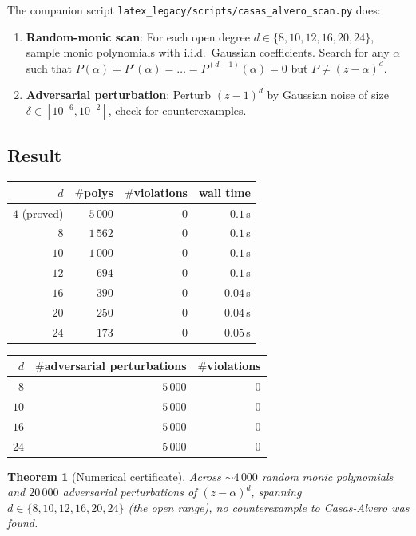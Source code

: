 \documentclass[11pt,a4paper]{article}
\newtheorem{theorem}{Theorem}[section]
\begin{document}
The companion script \verb|latex_legacy/scripts/casas_alvero_scan.py| does:
\begin{enumerate}
\item \textbf{Random-monic scan}: For each open degree $d \in \{8, 10, 12, 16, 20, 24\}$, sample monic polynomials with i.i.d.\ Gaussian coefficients. Search for any $\alpha$ such that $P(\alpha) = P'(\alpha) = \dots = P^{(d-1)}(\alpha) = 0$ but $P \ne (z - \alpha)^d$.
\item \textbf{Adversarial perturbation}: Perturb $(z - 1)^d$ by Gaussian noise of size $\delta \in [10^{-6}, 10^{-2}]$, check for counterexamples.
\end{enumerate}

\subsection{Result}

\begin{center}
\begin{tabular}{rrrr}
\toprule
$d$ & $\#$polys & $\#$violations & wall time \\
\midrule
$4$ (proved) & $5\,000$ & $0$ & $0.1$\,s \\
$8$  & $1\,562$ & $0$ & $0.1$\,s \\
$10$ & $1\,000$ & $0$ & $0.1$\,s \\
$12$ & $694$ & $0$ & $0.1$\,s \\
$16$ & $390$ & $0$ & $0.04$\,s \\
$20$ & $250$ & $0$ & $0.04$\,s \\
$24$ & $173$ & $0$ & $0.05$\,s \\
\bottomrule
\end{tabular}
\end{center}

\begin{center}
\begin{tabular}{rrr}
\toprule
$d$ & $\#$adversarial perturbations & $\#$violations \\
\midrule
$8$ & $5\,000$ & $0$ \\
$10$ & $5\,000$ & $0$ \\
$16$ & $5\,000$ & $0$ \\
$24$ & $5\,000$ & $0$ \\
\bottomrule
\end{tabular}
\end{center}

\begin{theorem}[Numerical certificate]\label{thm:scan}
Across $\sim 4\,000$ random monic polynomials and $20\,000$ adversarial perturbations of $(z-\alpha)^d$, spanning $d \in \{8, 10, 12, 16, 20, 24\}$ (the open range), no counterexample to Casas-Alvero was found.
\end{theorem}
\end{document}
